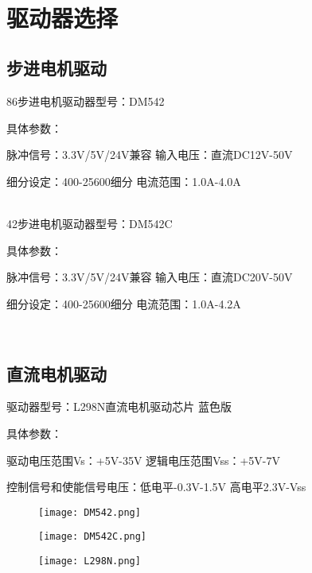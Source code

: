         
~\\

\section{驱动器选择}

\subsection{步进电机驱动}

86步进电机驱动器型号：DM542

具体参数：
\begin{minipage}[t]{09\linewidth}
    脉冲信号：3.3V/5V/24V兼容   \qquad
    输入电压：直流DC12V-50V

    细分设定：400-25600细分     \qquad \quad
    电流范围：1.0A-4.0A
\end{minipage}
\\

42步进电机驱动器型号：DM542C

具体参数：
\begin{minipage}[t]{09\linewidth}
    脉冲信号：3.3V/5V/24V兼容   \qquad
    输入电压：直流DC20V-50V

    细分设定：400-25600细分     \qquad \quad
    电流范围：1.0A-4.2A
\end{minipage}
\\

\subsection{直流电机驱动}

驱动器型号：L298N直流电机驱动芯片 \quad 蓝色版

具体参数：
\begin{minipage}[t]{09\linewidth}
    驱动电压范围Vs：+5V-35V    \qquad
    逻辑电压范围Vss：+5V-7V

    控制信号和使能信号电压：低电平-0.3V-1.5V  \quad
    高电平2.3V-Vss
\end{minipage}

\begin{figure}[!htp]
    \begin{minipage}{0.32\textwidth}
      \centering
      \texttt{[image: DM542.png]}
      \label{fig:DM542}
    \end{minipage}\hfill
    \begin{minipage}{0.32\textwidth}
      \centering
      \texttt{[image: DM542C.png]}
      \label{fig:DM542C}
    \end{minipage}
    \begin{minipage}{0.32\textwidth}
      \centering
      \texttt{[image: L298N.png]}
      \label{fig:L298N}
    \end{minipage}
\end{figure}

